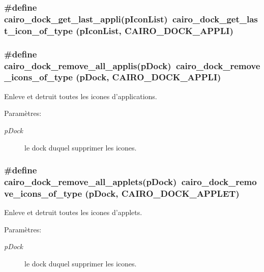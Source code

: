 \subsubsection{\setlength{\rightskip}{0pt plus 5cm}\#define cairo\_\-dock\_\-get\_\-last\_\-appli(pIconList)~cairo\_\-dock\_\-get\_\-last\_\-icon\_\-of\_\-type (pIconList, CAIRO\_\-DOCK\_\-APPLI)}\label{cairo-dock-icons_8h_27200a190c2b4509d88f031a7d6644fd}


\subsubsection{\setlength{\rightskip}{0pt plus 5cm}\#define cairo\_\-dock\_\-remove\_\-all\_\-applis(pDock)~cairo\_\-dock\_\-remove\_\-icons\_\-of\_\-type (pDock, CAIRO\_\-DOCK\_\-APPLI)}\label{cairo-dock-icons_8h_f175647b17ec66d6a2edeca1103f2615}


Enleve et detruit toutes les icones d'applications. \begin{Desc}
\item[Paramètres:]
\begin{description}
\item[{\em pDock}]le dock duquel supprimer les icones. \end{description}
\end{Desc}
\subsubsection{\setlength{\rightskip}{0pt plus 5cm}\#define cairo\_\-dock\_\-remove\_\-all\_\-applets(pDock)~cairo\_\-dock\_\-remove\_\-icons\_\-of\_\-type (pDock, CAIRO\_\-DOCK\_\-APPLET)}\label{cairo-dock-icons_8h_e074743a16695924ea1449fc0d7f42ef}


Enleve et detruit toutes les icones d'applets. \begin{Desc}
\item[Paramètres:]
\begin{description}
\item[{\em pDock}]le dock duquel supprimer les icones. \end{description}
\end{Desc}


